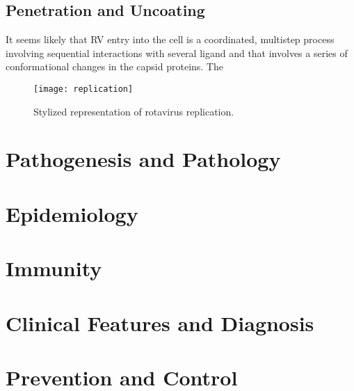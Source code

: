 \subsection{Penetration and Uncoating}

It seems likely that RV entry into the cell is a coordinated, multistep process involving sequential interactions with several ligand and that involves a series of conformational changes in the capsid proteins. The

\begin{landscape}
\begin{figure}[htp]
\texttt{[image: replication]}\\
\caption{Stylized representation of rotavirus replication.}
\end{figure}
\end{landscape}

\section{Pathogenesis and Pathology}

\section{Epidemiology}

\section{Immunity}

\section{Clinical Features and Diagnosis}

\section{Prevention and Control}